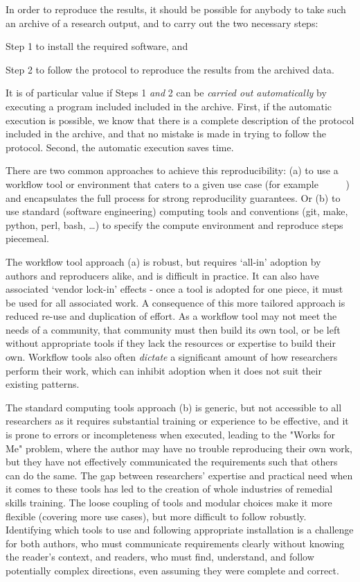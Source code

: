 In order to reproduce the results, it should be possible for anybody to take such an archive of a research
output, and to carry out the two necessary steps:
\begin{compactitem}
\item Step 1 to install the required software, and
\item Step 2 to follow the protocol to reproduce the results from the archived data.
\end{compactitem}

It is of particular value if Steps 1 \emph{and} 2 can be \emph{carried out
  automatically} by executing a program included included in the
archive. First, if the automatic execution is possible, we know that there is a
complete description of the protocol included in the archive, and that no
mistake is made in trying to follow the protocol. Second, the automatic
execution saves time.

There are two common approaches to achieve this reproducibility: (a) to use a
workflow tool or environment that caters to a given use case (for example
~\cite{reana2019} ~\cite{Afgan2018} ~\cite{Mlder2021} )
and encapsulates the full process for strong reproducility guarantees.
Or (b) to use standard (software engineering) computing tools and conventions
(git, make, python, perl, bash, \ldots)
to specify the compute environment and reproduce steps piecemeal.

The workflow tool approach (a) is robust, but requires `all-in' adoption by authors and reproducers alike,
and is difficult in practice. It can also have associated `vendor lock-in' effects
- once a tool is adopted for one piece, it must be used for all associated work.
A consequence of this more tailored approach is reduced re-use and duplication of effort.
As a workflow tool may not meet the needs of a community,
that community must then build its own tool, or be left without appropriate tools
if they lack the resources or expertise to build their own.
Workflow tools also often \emph{dictate} a significant amount of how researchers perform their work,
which can inhibit adoption when it does not suit their existing patterns.

The standard computing tools approach (b) is generic, but not accessible to all researchers
as it requires substantial training or experience to be effective,
and it is prone to errors or incompleteness when executed,
leading to the "Works for Me" problem,
where the author may have no trouble reproducing their own work,
but they have not effectively communicated the requirements such that others can do the same.
The gap
between researchers' expertise and practical need when it comes to these tools has led to the creation
of whole industries of remedial skills training.
The loose coupling of tools and modular choices make it more flexible (covering more use cases),
but more difficult to follow robustly.
Identifying which tools to use and following appropriate installation is a challenge
for both authors, who must communicate requirements clearly without knowing the reader's context,
and readers, who must find, understand, and follow potentially complex directions, even assuming they were
complete and correct.

